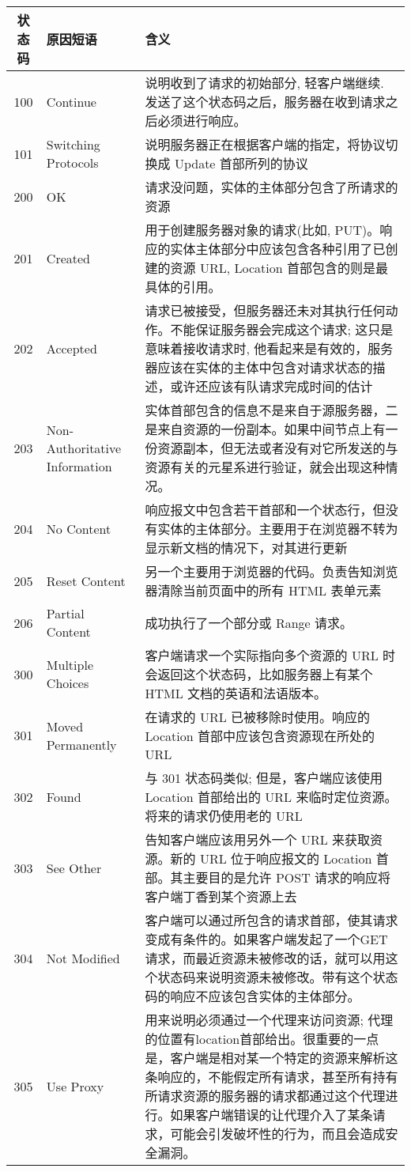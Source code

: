 \begin{longtable}{|c|l|l|}   %
\hline
状态码 & 原因短语 & 含义\\
\hline
100 & Continue & 说明收到了请求的初始部分, 轻客户端继续. 发送了这个状态码之后，服务器在收到请求之后必须进行响应。\\
101 & Switching Protocols & 说明服务器正在根据客户端的指定，将协议切换成 Update 首部所列的协议\\
200 & OK & 请求没问题，实体的主体部分包含了所请求的资源\\
201 & Created & 用于创建服务器对象的请求(比如, PUT)。响应的实体主体部分中应该包含各种引用了已创建的资源 URL, Location 首部包含的则是最具体的引用。\\
202 & Accepted & 请求已被接受，但服务器还未对其执行任何动作。不能保证服务器会完成这个请求; 这只是意味着接收请求时, 他看起来是有效的，服务器应该在实体的主体中包含对请求状态的描述，或许还应该有队请求完成时间的估计\\
203 & Non-Authoritative Information & 实体首部包含的信息不是来自于源服务器，二是来自资源的一份副本。如果中间节点上有一份资源副本，但无法或者没有对它所发送的与资源有关的元星系进行验证，就会出现这种情况。\\
204 & No Content & 响应报文中包含若干首部和一个状态行，但没有实体的主体部分。主要用于在浏览器不转为显示新文档的情况下，对其进行更新\\
205 & Reset Content & 另一个主要用于浏览器的代码。负责告知浏览器清除当前页面中的所有 HTML 表单元素\\
206 & Partial Content & 成功执行了一个部分或 Range 请求。\\
300 & Multiple Choices & 客户端请求一个实际指向多个资源的 URL 时会返回这个状态码，比如服务器上有某个 HTML 文档的英语和法语版本。\\
301 & Moved Permanently & 在请求的 URL 已被移除时使用。响应的 Location 首部中应该包含资源现在所处的 URL\\
302 & Found & 与 301 状态码类似; 但是，客户端应该使用 Location 首部给出的 URL 来临时定位资源。将来的请求仍使用老的 URL\\
303 & See Other & 告知客户端应该用另外一个 URL 来获取资源。新的 URL 位于响应报文的 Location 首部。其主要目的是允许 POST 请求的响应将客户端丁香到某个资源上去\\
304 & Not Modified & 客户端可以通过所包含的请求首部，使其请求变成有条件的。如果客户端发起了一个GET请求，而最近资源未被修改的话，就可以用这个状态码来说明资源未被修改。带有这个状态码的响应不应该包含实体的主体部分。\\
305 & Use Proxy & 用来说明必须通过一个代理来访问资源; 代理的位置有location首部给出。很重要的一点是，客户端是相对某一个特定的资源来解析这条响应的，不能假定所有请求，甚至所有持有所请求资源的服务器的请求都通过这个代理进行。如果客户端错误的让代理介入了某条请求，可能会引发破坏性的行为，而且会造成安全漏洞。\\

\end{longtable}
